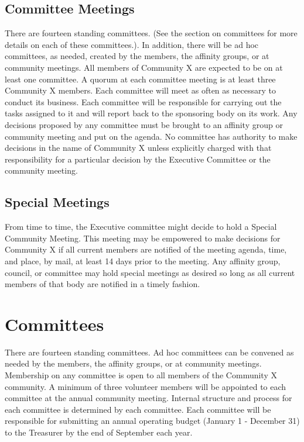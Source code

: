 \subsection*{Committee Meetings}
There are fourteen standing committees. (See the section on committees for more details on each of these committees.). In addition, there will be ad hoc committees, as needed, created by the members, the affinity groups, or at community meetings. All members of Community X are expected to be on at least one committee. A quorum at each committee meeting is at least three Community X members. Each committee will meet as often as necessary to conduct its business. Each committee will be responsible for carrying out the tasks assigned to it and will report back to the sponsoring body on its work. Any decisions proposed by any committee must be brought to an affinity group or community meeting and put on the agenda. No committee has authority to make decisions in the name of Community X unless explicitly charged with that responsibility for a particular decision by the Executive Committee or the community meeting.


\subsection*{Special Meetings}
From time to time, the Executive committee might decide to hold a Special Community Meeting. This meeting may be empowered to make decisions for Community X if all current members are notified of the meeting agenda, time, and place, by mail, at least 14 days prior to the meeting. Any affinity group, council, or committee may hold special meetings as desired so long as all current members of that body are notified in a timely fashion.


\section*{Committees}
There are fourteen standing committees. Ad hoc committees can be convened as needed by the members, the affinity groups, or at community meetings. Membership on any committee is open to all members of the Community X community. A minimum of three volunteer members will be appointed to each committee at the annual community meeting. Internal structure and process for each committee is determined by each committee. Each committee will be responsible for submitting an annual operating budget (January 1 - December 31) to the Treasurer by the end of September each year.


